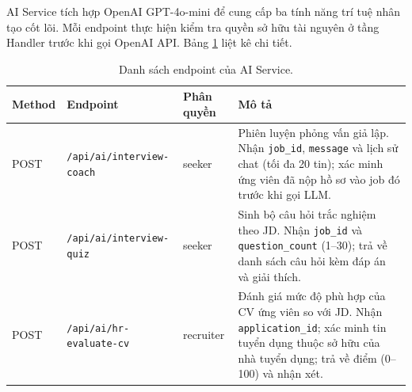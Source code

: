 \documentclass[../DoAn.tex]{subfiles}
\begin{document}
AI Service tích hợp OpenAI GPT-4o-mini để cung cấp ba tính năng trí tuệ nhân tạo cốt lõi. Mỗi endpoint thực hiện kiểm tra quyền sở hữu tài nguyên ở tầng Handler trước khi gọi OpenAI API. Bảng \ref{tab:api-ai} liệt kê chi tiết.

\begin{table}[H]
\centering
\caption{Danh sách endpoint của AI Service.}
\label{tab:api-ai}
\small
\begin{tabular}{|p{1.3cm}|p{5.5cm}|p{2.4cm}|p{4.5cm}|}
\hline
\textbf{Method} & \textbf{Endpoint} & \textbf{Phân quyền} & \textbf{Mô tả} \\ \hline
POST & \texttt{/api/ai/interview-coach} & seeker & Phiên luyện phỏng vấn giả lập. Nhận \texttt{job\_id}, \texttt{message} và lịch sử chat (tối đa 20 tin); xác minh ứng viên đã nộp hồ sơ vào job đó trước khi gọi LLM. \\ \hline
POST & \texttt{/api/ai/interview-quiz} & seeker & Sinh bộ câu hỏi trắc nghiệm theo JD. Nhận \texttt{job\_id} và \texttt{question\_count} (1--30); trả về danh sách câu hỏi kèm đáp án và giải thích. \\ \hline
POST & \texttt{/api/ai/hr-evaluate-cv} & recruiter & Đánh giá mức độ phù hợp của CV ứng viên so với JD. Nhận \texttt{application\_id}; xác minh tin tuyển dụng thuộc sở hữu của nhà tuyển dụng; trả về điểm (0--100) và nhận xét. \\ \hline
\end{tabular}
\end{table}
\end{document}
